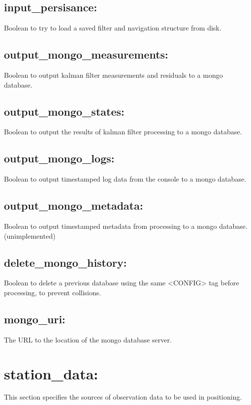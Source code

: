 \subsection{input\_persisance:}
Boolean to try to load a saved filter and navigation structure from disk.

\subsection{output\_mongo\_measurements:}
Boolean to output kalman filter measurements and residuals to a mongo database.

\subsection{output\_mongo\_states:}
Boolean to output the results of kalman filter processing to a mongo database.

\subsection{output\_mongo\_logs:}
Boolean to output timestamped log data from the console to a mongo database.

\subsection{output\_mongo\_metadata:}
Boolean to output timestamped metadata from processing to a mongo database. (unimplemented)

\subsection{delete\_mongo\_history:}
Boolean to delete a previous database using the same <CONFIG> tag before processing, to prevent collisions.

\subsection{mongo\_uri:}
The URL to the location of the mongo database server.









\section{station\_data:}
This section specifies the sources of observation data to be used in positioning.

